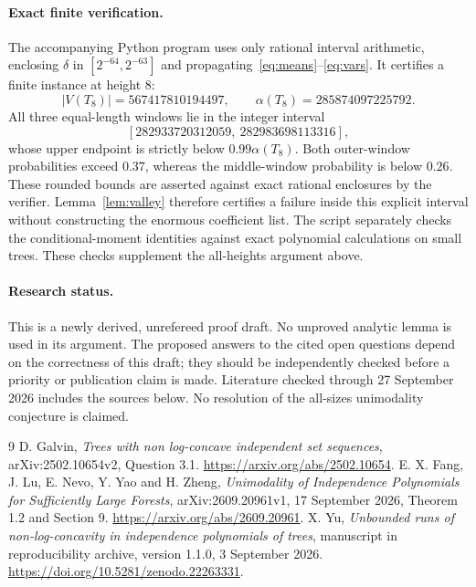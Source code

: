 \documentclass[11pt]{article}
\begin{document}
\paragraph{Exact finite verification.}
The accompanying Python program uses only rational interval arithmetic, enclosing $\delta$ in $[2^{-64},2^{-63}]$ and propagating~\eqref{eq:means}--\eqref{eq:vars}. It certifies a finite instance at height $8$:
\[
 |V(T_8)|=567417810194497,\qquad
 \alpha(T_8)=285874097225792.
\]
All three equal-length windows lie in the integer interval
\[
 [282933720312059,\ 282983698113316],
\]
whose upper endpoint is strictly below $0.99\alpha(T_8)$. Both outer-window probabilities exceed $0.37$, whereas the middle-window probability is below $0.26$. These rounded bounds are asserted against exact rational enclosures by the verifier. Lemma~\ref{lem:valley} therefore certifies a failure inside this explicit interval without constructing the enormous coefficient list. The script separately checks the conditional-moment identities against exact polynomial calculations on small trees. These checks supplement the all-heights argument above.

\paragraph{Research status.}
This is a newly derived, unrefereed proof draft. No unproved analytic lemma is used in its argument. The proposed answers to the cited open questions depend on the correctness of this draft; they should be independently checked before a priority or publication claim is made. Literature checked through 27 September 2026 includes the sources below. No resolution of the all-sizes unimodality conjecture is claimed.

\begin{thebibliography}{9}\small
{} D. Galvin, \emph{Trees with non log-concave independent set sequences}, arXiv:2502.10654v2, Question 3.1. \url{https://arxiv.org/abs/2502.10654}.
 E. X. Fang, J. Lu, E. Nevo, Y. Yao and H. Zheng,
\emph{Unimodality of Independence Polynomials for Sufficiently Large Forests}, arXiv:2609.20961v1, 17 September 2026, Theorem 1.2 and Section 9. \url{https://arxiv.org/abs/2609.20961}.
 X. Yu, \emph{Unbounded runs of non-log-concavity in independence polynomials of trees}, manuscript in reproducibility archive, version 1.1.0, 3 September 2026. \url{https://doi.org/10.5281/zenodo.22263331}.
\end{thebibliography}
\end{document}
